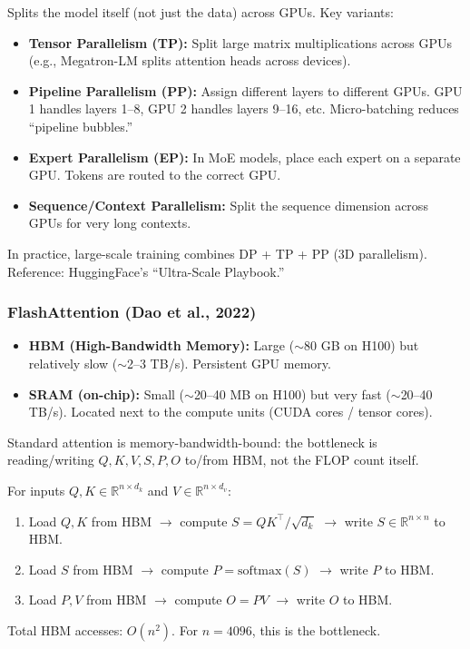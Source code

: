 \documentclass[11pt, a4paper]{article}
\begin{document}
\begin{defbox}
Splits the model itself (not just the data) across GPUs. Key variants:
\begin{itemize}[leftmargin=1.5em]
  \item \textbf{Tensor Parallelism (TP):} Split large matrix multiplications across GPUs (e.g., Megatron-LM splits attention heads across devices).
  \item \textbf{Pipeline Parallelism (PP):} Assign different layers to different GPUs. GPU 1 handles layers 1--8, GPU 2 handles layers 9--16, etc. Micro-batching reduces ``pipeline bubbles.''
  \item \textbf{Expert Parallelism (EP):} In MoE models, place each expert on a separate GPU. Tokens are routed to the correct GPU.
  \item \textbf{Sequence/Context Parallelism:} Split the sequence dimension across GPUs for very long contexts.
\end{itemize}
In practice, large-scale training combines DP + TP + PP (3D parallelism). Reference: HuggingFace's ``Ultra-Scale Playbook.''
\end{defbox}

\subsubsection{FlashAttention (Dao et al., 2022)}

\begin{defbox}
\begin{itemize}[leftmargin=1.5em]
  \item \textbf{HBM (High-Bandwidth Memory):} Large ($\sim$80 GB on H100) but relatively slow ($\sim$2--3 TB/s). Persistent GPU memory.
  \item \textbf{SRAM (on-chip):} Small ($\sim$20--40 MB on H100) but very fast ($\sim$20--40 TB/s). Located next to the compute units (CUDA cores / tensor cores).
\end{itemize}
Standard attention is memory-bandwidth-bound: the bottleneck is reading/writing $Q, K, V, S, P, O$ to/from HBM, not the FLOP count itself.
\end{defbox}

\begin{defbox}
For inputs $Q, K \in \mathbb{R}^{n \times d_k}$ and $V \in \mathbb{R}^{n \times d_v}$:
\begin{enumerate}[leftmargin=1.5em]
  \item Load $Q, K$ from HBM $\to$ compute $S = QK^\top / \sqrt{d_k}$ $\to$ write $S \in \mathbb{R}^{n \times n}$ to HBM.
  \item Load $S$ from HBM $\to$ compute $P = \text{softmax}(S)$ $\to$ write $P$ to HBM.
  \item Load $P, V$ from HBM $\to$ compute $O = PV$ $\to$ write $O$ to HBM.
\end{enumerate}
Total HBM accesses: $O(n^2)$. For $n=4096$, this is the bottleneck.
\end{defbox}
\end{document}
